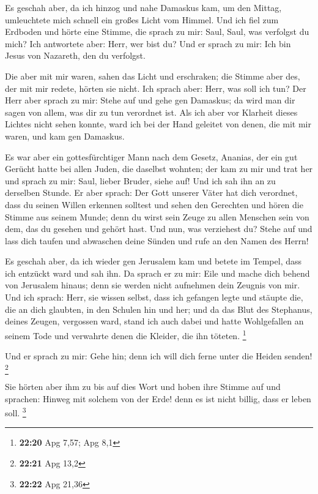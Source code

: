  Es geschah aber, da ich hinzog und nahe Damaskus kam, um
den Mittag, umleuchtete mich schnell ein großes Licht vom Himmel.
 Und ich fiel zum Erdboden und hörte eine Stimme, die sprach
zu mir: Saul, Saul, was verfolgst du mich?  Ich antwortete
aber: Herr, wer bist du? Und er sprach zu mir: Ich bin Jesus von
Nazareth, den du verfolgst.

 Die aber mit mir waren, sahen das Licht und erschraken; die
Stimme aber des, der mit mir redete, hörten sie nicht.  Ich
sprach aber: Herr, was soll ich tun? Der Herr aber sprach zu mir: Stehe
auf und gehe gen Damaskus; da wird man dir sagen von allem, was dir zu
tun verordnet ist.  Als ich aber vor Klarheit dieses
Lichtes nicht sehen konnte, ward ich bei der Hand geleitet von denen,
die mit mir waren, und kam gen Damaskus.

 Es war aber ein gottesfürchtiger Mann nach dem Gesetz,
Ananias, der ein gut Gerücht hatte bei allen Juden, die daselbst
wohnten;  der kam zu mir und trat her und sprach zu mir:
Saul, lieber Bruder, siehe auf! Und ich sah ihn an zu derselben Stunde.
 Er aber sprach: Der Gott unserer Väter hat dich verordnet,
dass du seinen Willen erkennen solltest und sehen den Gerechten und
hören die Stimme aus seinem Munde;  denn du wirst sein
Zeuge zu allen Menschen sein von dem, das du gesehen und gehört hast.
 Und nun, was verziehest du? Stehe auf und lass dich taufen
und abwaschen deine Sünden und rufe an den Namen des Herrn!

 Es geschah aber, da ich wieder gen Jerusalem kam und
betete im Tempel, dass ich entzückt ward und sah ihn.  Da
sprach er zu mir: Eile und mache dich behend von Jerusalem hinaus; denn
sie werden nicht aufnehmen dein Zeugnis von mir.  Und ich
sprach: Herr, sie wissen selbst, dass ich gefangen legte und stäupte
die, die an dich glaubten, in den Schulen hin und her;  und
da das Blut des Stephanus, deines Zeugen, vergossen ward, stand ich auch
dabei und hatte Wohlgefallen an seinem Tode und verwahrte denen die
Kleider, die ihn töteten. \footnote{\textbf{22:20} Apg 7,57; Apg 8,1}

 Und er sprach zu mir: Gehe hin; denn ich will dich ferne
unter die Heiden senden! \footnote{\textbf{22:21} Apg 13,2}

 Sie hörten aber ihm zu bis auf dies Wort und hoben ihre
Stimme auf und sprachen: Hinweg mit solchem von der Erde! denn es ist
nicht billig, dass er leben soll. \footnote{\textbf{22:22} Apg 21,36}

